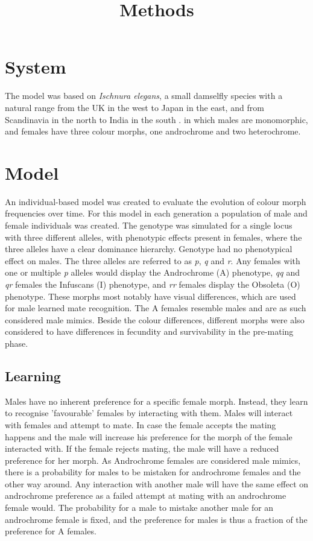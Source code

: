 \documentclass[10pt,letterpaper]{article}
\title{Methods}
\date{\vspace{-5ex}}
\begin{document}
\maketitle

\section{System}
The model was based on \textit{Ischnura elegans}, a small damselfly species with a natural range from the UK in the west to Japan in the east, and from Scandinavia in the north to India in the south \cite{IUCNisch}.
in which males are monomorphic, and females have three colour morphs, one androchrome and two heterochrome.

\section{Model}
An individual-based model was created to evaluate the evolution of colour morph frequencies over time. For this model in each generation a population of male and female individuals was created. The genotype was simulated for a single locus with three different alleles, with phenotypic effects present in females, where the three alleles have a clear dominance hierarchy. Genotype had no phenotypical effect on males. The three alleles are referred to as \textit{p}, \textit{q} and \textit{r}. Any females with one or multiple \textit{p} alleles would display the Androchrome (A) phenotype, \textit{qq} and \textit{qr} females the Infuscans (I) phenotype, and \textit{rr} females display the Obsoleta (O) phenotype. These morphs most notably have visual differences, which are used for male learned mate recognition. The A females resemble males and are as such considered male mimics. Beside the colour differences, different morphs were also considered to have differences in fecundity and survivability in the pre-mating phase.

\subsection{Learning}
Males have no inherent preference for a specific female morph. Instead, they learn to recognise 'favourable' females by interacting with them. Males will interact with females and attempt to mate. In case the female accepts the mating happens and the male will increase his preference for the morph of the female interacted with. If the female rejects mating, the male will have a reduced preference for her morph. As Androchrome females are considered male mimics, there is a probability for males to be mistaken for androchrome females and the other way around. Any interaction with another male will have the same effect on androchrome preference as a failed attempt at mating with an androchrome female would. The probability for a male to mistake another male for an androchrome female is fixed, and the preference for males is thus a fraction of the preference for A females.
\end{document}
